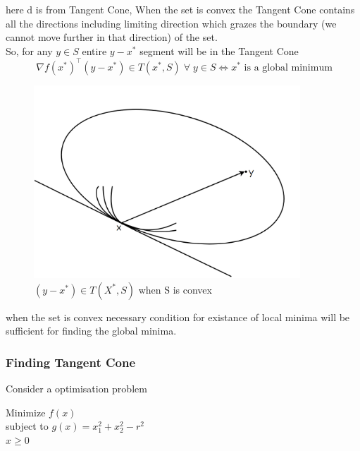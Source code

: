 \documentclass[twoside]{article}
\begin{document}
here d is from Tangent Cone, When the set is convex the Tangent Cone contains all the directions including limiting direction which grazes the boundary (we cannot move further in that direction) of the set.\\
So, for any $y \in S$ entire $ y-x^*$ segment will be in the Tangent Cone \\

$$\:\nabla f(x^{*})^\top(y-x^{*}) \in T(x^{*},S)  \; \forall \;y\in S \iff x^* \text{ is a global minimum}$$

\begin{figure}[h]
\center
\includegraphics[width=10cm]{images/pic3.png}
\caption{$(y-x^*) \in T(X^*, S)$ when S is convex}
\end{figure}

when the set is convex necessary condition for existance of local minima will be sufficient for finding the global minima.\\

\subsubsection{Finding Tangent Cone}

Consider a optimisation problem 
\begin{center}
    Minimize $f(x)$\\
    subject to $ g(x) = x^{2}_{1}+x^{2}_2-r^{2}$\\$x\geq0$ 
\end{center}
\end{document}
